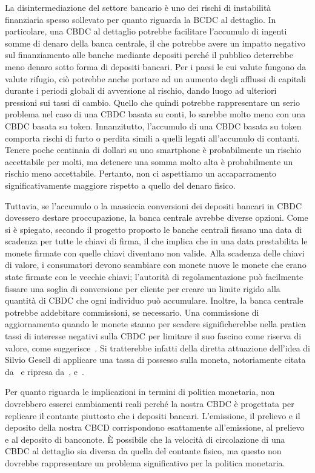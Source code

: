 \documentclass{article}
\begin{document}
La disintermediazione del settore bancario è uno dei rischi di
instabilità finanziaria spesso sollevato per quanto riguarda la BCDC
al dettaglio. In particolare, una CBDC al dettaglio potrebbe
facilitare l'accumulo di ingenti somme di denaro della banca
centrale, il che potrebbe avere un impatto negativo sul finanziamento
alle banche mediante depositi perché il pubblico deterrebbe meno
denaro sotto forma di depositi bancari. Per i paesi le cui valute
fungono da valute rifugio, ciò potrebbe anche portare ad un aumento
degli afflussi di capitali durante i periodi globali di avversione al
rischio, dando luogo ad ulteriori pressioni sui tassi di cambio.
Quello che quindi potrebbe rappresentare un serio problema nel caso di
una CBDC basata su conti, lo sarebbe molto meno con una CBDC basata
su token. Innanzitutto, l'accumulo di una CBDC basata su token comporta
rischi di furto o perdita simili a quelli legati all'accumulo di
contanti. Tenere poche centinaia di dollari su uno smartphone è
probabilmente un rischio accettabile per molti, ma detenere una somma
molto alta è probabilmente un rischio meno accettabile. Pertanto, non
ci aspettiamo un accaparramento significativamente maggiore rispetto a
quello del denaro fisico.

Tuttavia, se l'accumulo o la massiccia conversioni dei depositi
bancari in CBDC dovessero destare proccupazione, la banca centrale
avrebbe diverse opzioni. Come si è spiegato, secondo il progetto
proposto le banche centrali fissano una data di scadenza per tutte le
chiavi di firma, il che implica che in una data prestabilita le monete
firmate con quelle chiavi diventano non valide. Alla scadenza delle
chiavi di valore, i consumatori devono scambiare con monete nuove le
monete che erano state firmate con le vecchie chiavi; l'autorità di
regolamentazione può facilmente fissare una soglia di conversione per
cliente per creare un limite rigido alla quantità di CBDC che ogni
individuo può accumulare. Inoltre, la banca centrale potrebbe addebitare
commissioni, se necessario. Una commissione di aggiornamento quando le monete
stanno per scadere significherebbe nella pratica tassi di interesse negativi
sulla CBDC per limitare il suo fascino come riserva di valore, come
suggerisce~\cite{Bindseil}. Si tratterebbe infatti della diretta attuazione
dell'idea di Silvio Gesell di applicare una tassa di possesso sulla moneta,
notoriamente citata da~\cite{Keynes} e ripresa da~\cite{Goodfriend},
\cite{Buiter} e~\cite{Agarwal}.

Per quanto riguarda le implicazioni in termini di politica monetaria,
non dovrebbero esserci cambiamenti reali perché la nostra CBDC è
progettata per replicare il contante piuttosto che i depositi bancari.
L'emissione, il prelievo e il deposito della nostra CBCD corrispondono
esattamente all'emissione, al prelievo e al deposito di banconote. È
possibile che la velocità di circolazione di una CBDC al dettaglio sia
diversa da quella del contante fisico, ma questo non dovrebbe
rappresentare un problema significativo per la politica monetaria.
\end{document}
